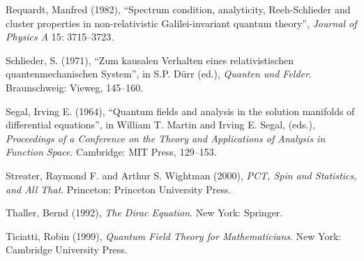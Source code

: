 \documentclass[12pt]{article}
\theoremstyle{remark}
\begin{document}
Requardt, Manfred (1982), ``Spectrum condition, analyticity,
Reeh-Schlieder and cluster properties in non-relativistic
Galilei-invariant quantum theory'', {\it Journal of Physics A} 15:
3715--3723.

Schlieder, S. (1971), ``Zum kausalen Verhalten eines relativistischen
quantenmechanischen System'', in S.P. D{\"u}rr (ed.), {\it Quanten und
  Felder}.  Braunschweig: Vieweg, 145--160.

Segal, Irving E. (1964), ``Quantum fields and analysis in the solution
manifolds of differential equations'', in William T. Martin and Irving
E. Segal, (eds.), {\it Proceedings of a Conference on the Theory and
  Applications of Analysis in Function Space}.  Cambridge: MIT Press,
129--153.

Streater, Raymond F. and Arthur S. Wightman (2000), {\it PCT, Spin and
  Statistics, and All That}. Princeton: Princeton University Press.

Thaller, Bernd (1992), {\it The Dirac Equation}.  New York: Springer.

Ticiatti, Robin (1999), {\it Quantum Field Theory for Mathematicians}.
New York: Cambridge University Press.
\end{document}
